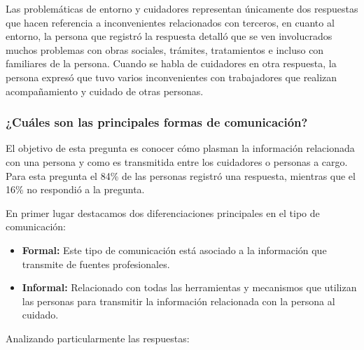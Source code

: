 \documentclass[a4paper,12pt]{article}
\begin{document}
    Las problemáticas de entorno y cuidadores representan únicamente dos respuestas que hacen referencia a inconvenientes relacionados con terceros, en cuanto al entorno, la persona que registró la respuesta detalló que se ven involucrados muchos problemas con obras sociales, trámites, tratamientos e incluso con familiares de la persona. Cuando se habla de cuidadores en otra respuesta, la persona expresó que tuvo varios inconvenientes con trabajadores que realizan acompañamiento y cuidado de otras personas.
    \subsubsection{¿Cuáles son las principales formas de comunicación?}
    El objetivo de esta pregunta es conocer cómo plasman la información relacionada con una persona y como es transmitida entre los cuidadores o personas a cargo. \newline
    Para esta pregunta el 84\% de las personas registró una respuesta, mientras que el 16\% no respondió a la pregunta. \newline
         \newline
    En primer lugar destacamos dos diferenciaciones principales en el tipo de comunicación:
    \begin{itemize}
        \item \textbf{Formal:} Este tipo de comunicación está asociado a la información que transmite de fuentes profesionales.
        \item \textbf{Informal:} Relacionado con todas las herramientas y mecanismos que utilizan las personas para transmitir la información relacionada con la persona al cuidado.
    \end{itemize}
    Analizando particularmente las respuestas:
\end{document}
